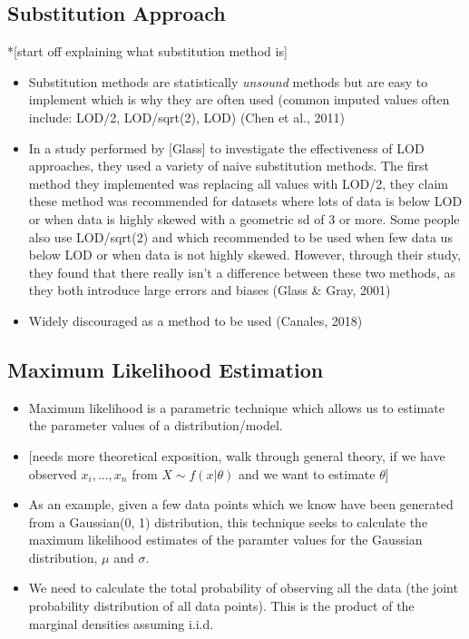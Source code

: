 \documentclass[12pt, twoside]{amherstthesis}
\begin{document}
\hypertarget{Substitution}{%
\subsection{Substitution Approach}\label{Substitution}}

*{[}start off explaining what substitution method is{]}
\begin{itemize}
\item
  Substitution methods are statistically \emph{unsound} methods but are easy to implement which is why they are often used (common imputed values often include: LOD/2, LOD/sqrt(2), LOD) (Chen et al., 2011)
\item
  In a study performed by {[}Glass{]} to investigate the effectiveness of LOD approaches, they used a variety of naive substitution methods. The first method they implemented was replacing all values with LOD/2, they claim these method was recommended for datasets where lots of data is below LOD or when data is highly skewed with a geometric sd of 3 or more. Some people also use LOD/sqrt(2) and which recommended to be used when few data us below LOD or when data is not highly skewed. However, through their study, they found that there really isn't a difference between these two methods, as they both introduce large errors and biases (Glass \& Gray, 2001)
\item
  Widely discouraged as a method to be used (Canales, 2018)
\end{itemize}
\hypertarget{MLE}{%
\subsection{Maximum Likelihood Estimation}\label{MLE}}
\begin{itemize}
\item
  Maximum likelihood is a parametric technique which allows us to estimate the parameter values of a distribution/model.
\item
  {[}needs more theoretical exposition, walk through general theory, if we have observed \(x_i, ..., x_n\) from \(X \sim f(x|\theta)\) and we want to estimate \(\theta\){]}
\item
  As an example, given a few data points which we know have been generated from a Gaussian(0, 1) distribution, this technique seeks to calculate the maximum likelihood estimates of the paramter values for the Gaussian distribution, \(\mu\) and \(\sigma\).
\item
  We need to calculate the total probability of observing all the data (the joint probability distribution of all data points). This is the product of the marginal densities assuming i.i.d.
\end{itemize}
\end{document}
